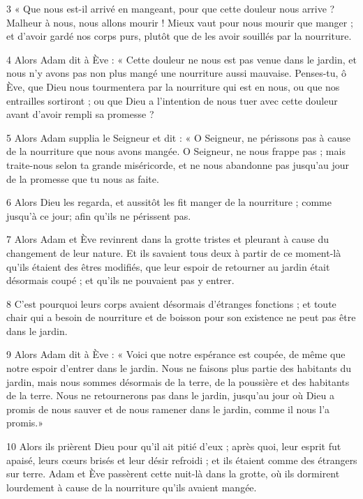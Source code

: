 \par 3 « Que nous est-il arrivé en mangeant, pour que cette douleur nous arrive ? Malheur à nous, nous allons mourir ! Mieux vaut pour nous mourir que manger ; et d'avoir gardé nos corps purs, plutôt que de les avoir souillés par la nourriture.

\par 4 Alors Adam dit à Ève : « Cette douleur ne nous est pas venue dans le jardin, et nous n'y avons pas non plus mangé une nourriture aussi mauvaise. Penses-tu, ô Ève, que Dieu nous tourmentera par la nourriture qui est en nous, ou que nos entrailles sortiront ; ou que Dieu a l’intention de nous tuer avec cette douleur avant d’avoir rempli sa promesse ?

\par 5 Alors Adam supplia le Seigneur et dit : « O Seigneur, ne périssons pas à cause de la nourriture que nous avons mangée. O Seigneur, ne nous frappe pas ; mais traite-nous selon ta grande miséricorde, et ne nous abandonne pas jusqu'au jour de la promesse que tu nous as faite.

\par 6 Alors Dieu les regarda, et aussitôt les fit manger de la nourriture ; comme jusqu'à ce jour; afin qu'ils ne périssent pas.

\par 7 Alors Adam et Ève revinrent dans la grotte tristes et pleurant à cause du changement de leur nature. Et ils savaient tous deux à partir de ce moment-là qu'ils étaient des êtres modifiés, que leur espoir de retourner au jardin était désormais coupé ; et qu'ils ne pouvaient pas y entrer.

\par 8 C'est pourquoi leurs corps avaient désormais d'étranges fonctions ; et toute chair qui a besoin de nourriture et de boisson pour son existence ne peut pas être dans le jardin.

\par 9 Alors Adam dit à Ève : « Voici que notre espérance est coupée, de même que notre espoir d'entrer dans le jardin. Nous ne faisons plus partie des habitants du jardin, mais nous sommes désormais de la terre, de la poussière et des habitants de la terre. Nous ne retournerons pas dans le jardin, jusqu'au jour où Dieu a promis de nous sauver et de nous ramener dans le jardin, comme il nous l'a promis.»

\par 10 Alors ils prièrent Dieu pour qu'il ait pitié d'eux ; après quoi, leur esprit fut apaisé, leurs cœurs brisés et leur désir refroidi ; et ils étaient comme des étrangers sur terre. Adam et Ève passèrent cette nuit-là dans la grotte, où ils dormirent lourdement à cause de la nourriture qu'ils avaient mangée.

